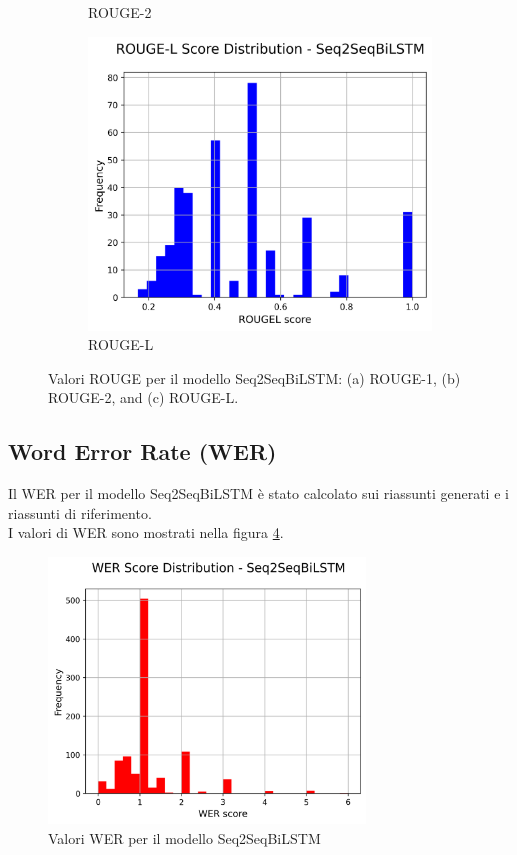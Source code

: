 \documentclass[a4paper, 12pt]{article}
\begin{document}
\begin{figure}[H]
\begin{subfigure}{0.32\textwidth}
        \caption{ROUGE-2}
        \label{fig:biLSTM_rouge_2}
    \end{subfigure}
    \hfill
    \begin{subfigure}{0.32\textwidth}
        \centering
        \includegraphics[width=\textwidth]{media/Seq2SeqBiLSTM_rougeL_scores.png}
        \caption{ROUGE-L}
        \label{fig:biLSTM_rouge_l}
    \end{subfigure}
    \caption{Valori ROUGE per il modello Seq2SeqBiLSTM: (a) ROUGE-1, (b) ROUGE-2, and (c) ROUGE-L.}
    \label{fig:biLSTM_rouge_scores}
\end{figure}

\subsection{Word Error Rate (WER)}
Il WER per il modello Seq2SeqBiLSTM è stato calcolato sui riassunti generati e i riassunti di riferimento.\\
I valori di WER sono mostrati nella figura \ref{fig:biLSTM_wer}.

\begin{figure}[H]
    \centering
    \includegraphics[width=0.75\textwidth]{media/Seq2SeqBiLSTM_wer_scores.png}
    \caption{Valori WER per il modello Seq2SeqBiLSTM}
    \label{fig:biLSTM_wer}
\end{figure}
\end{document}
